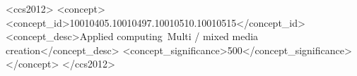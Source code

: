 \documentclass[sigconf,screen]{acmart}
\begin{document}
\renewcommand{\shortauthors}{Kavalar, Markovics, Rusher}

\begin{abstract}
Clerk is an open source Clojure programmer's assistant that builds upon the traditions of interactive and literate programming to provide a holistic moldable development environment. Clerk layers static analysis, incremental computation, and rich browser-based graphical presentations on top of a Clojure programmer\textquotesingle s familiar toolkit to enhance their workflow.
\end{abstract}

\begin{CCSXML}
<ccs2012>
   <concept>
       <concept_id>10010405.10010497.10010510.10010515</concept_id>
       <concept_desc>Applied computing~Multi / mixed media creation</concept_desc>
       <concept_significance>500</concept_significance>
       </concept>
 </ccs2012>
\end{CCSXML}



%


\maketitle
\end{document}
